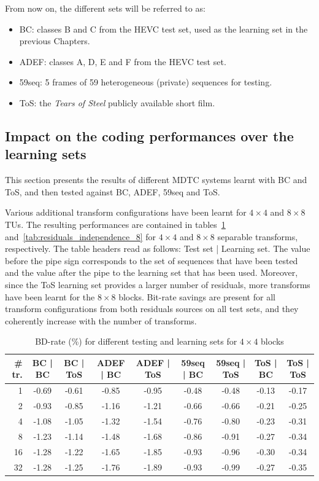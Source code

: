 \documentclass[11pt,a4paper,openright,twoside]{book}
\numberwithin{equation}{section} %
\numberwithin{figure}{section} %
\numberwithin{table}{section} %
\begin{document}
From now on, the different sets will be referred to as:
\begin{itemize}
	\item BC: classes B and C from the \ac{HEVC} test set, used as the
		learning set in the previous Chapters.
	\item ADEF: classes A, D, E and F from the \ac{HEVC} test set.
	\item 59seq: 5 frames of 59 heterogeneous (private) sequences for testing.
	\item ToS: the \emph{Tears of Steel} publicly available short film.
\end{itemize}

\subsection{Impact on the coding performances over the learning sets}
\label{sub:rw_performances_new_data_set}

This section presents the results of different \ac{MDTC} systems learnt with
BC and ToS, and then tested against BC, ADEF, 59seq and ToS.

Various additional transform configurations have been learnt for $4\times4$
and $8\times8$ \acp{TU}.
The resulting performances are contained in
tables~\ref{tab:residuals_independence_4}
and~\ref{tab:residuals_independence_8} for $4\times4$ and $8\times8$ separable
transforms, respectively.
The table headers read as follows: Test set | Learning set.
The value before the pipe sign corresponds to the set of sequences that have
been tested and the value after the pipe to the learning set that has been
used.
Moreover, since the ToS learning set provides a larger number of residuals,
more transforms have been learnt for the $8\times8$ blocks.
Bit-rate savings are present for all transform configurations from both
residuals sources on all test sets, and they coherently increase with the
number of transforms.

\begin{table}[tb]
	\centering
	\small
	\begin{tabularx}{\linewidth}{r|cc|cc|cc|cc}
		\# tr. & BC | BC & BC | ToS & ADEF | BC & ADEF | ToS & 59seq | BC &
		59seq | ToS & ToS | BC & ToS | ToS \\
		\hline\hline
		1  & -0.69 & -0.61 & -0.85 & -0.95 & -0.48 & -0.48 & -0.13 & -0.17 \\
		2  & -0.93 & -0.85 & -1.16 & -1.21 & -0.66 & -0.66 & -0.21 & -0.25 \\
		4  & -1.08 & -1.05 & -1.32 & -1.54 & -0.76 & -0.80 & -0.23 & -0.31 \\
		8  & -1.23 & -1.14 & -1.48 & -1.68 & -0.86 & -0.91 & -0.27 & -0.34 \\
		16 & -1.28 & -1.22 & -1.65 & -1.85 & -0.93 & -0.96 & -0.30 & -0.34 \\
		32 & -1.28 & -1.25 & -1.76 & -1.89 & -0.93 & -0.99 & -0.27 & -0.35 \\
	\end{tabularx}
	\caption{\acs{BD}-rate (\%) for different testing and learning sets for
	$4\times4$ blocks}
	\label{tab:residuals_independence_4}
\end{table}
\end{document}
